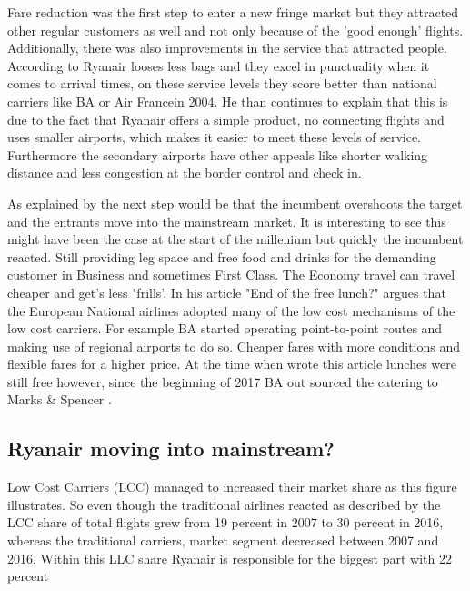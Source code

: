 \documentclass[a4paper, 11pt]{article}
\begin{document}
{{Fare reduction was the first step to enter a new fringe market but they attracted other regular customers as well and not only because of the 'good enough' flights. Additionally, there was also improvements in the service that attracted people. According to \cite{Barrett} Ryanair looses less bags and they excel in punctuality when it comes to arrival times, on these service levels they score better than national carriers like BA or Air Francein 2004. He \citep{Barrett} than continues to explain that this is due to the fact that Ryanair offers a simple product, no connecting flights and uses smaller airports, which makes it easier to meet these levels of service. Furthermore the secondary airports have other appeals like shorter walking distance and less congestion at the border control and check in.

As explained by \cite{chistensen} the next step would be that the incumbent overshoots the target and the entrants move into the mainstream market. It is interesting to see this might have been the case at the start of the millenium but quickly the incumbent reacted. Still providing leg space and free food and drinks for the demanding customer in Business and sometimes First Class. The Economy travel can travel cheaper and get's less "frills'. In his article "End of the free lunch?" \cite{Dennis} argues that the European National airlines adopted many of the low cost mechanisms of the low cost carriers. For example BA started operating point-to-point routes and making use of regional airports to do so. Cheaper fares with more conditions and flexible fares for a higher price. At the time when \cite{Dennis} wrote this article lunches were still free however, since the beginning of 2017 BA out sourced the catering to Marks & Spencer \citep{calder}. 


\subsection{Ryanair moving into mainstream?}
\label{limits}


Low Cost Carriers (LCC) managed to increased their market share as this figure illustrates. So even though the traditional airlines reacted as described by \citep{Dennis} the LCC share of total flights grew from 19 percent in 2007 to 30 percent in 2016, whereas the traditional carriers, market segment decreased between 2007 and 2016. Within this LLC share Ryanair is responsible for the biggest part with 22 percent 

}}
\end{document}

